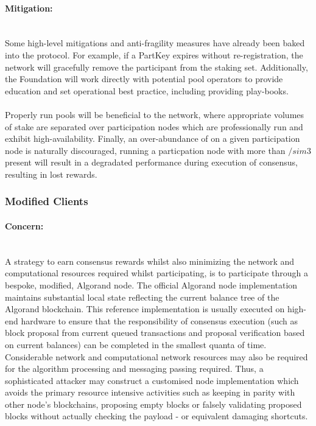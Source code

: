 \documentclass[11pt,a4paper]{article}
\begin{document}
\paragraph{Mitigation:} \mbox{}\\
Some high-level mitigations and anti-fragility measures have already been baked into the protocol. For example, if a
\gls{PartKey} expires without re-registration, the network will gracefully remove the participant from the staking set.
Additionally, the Foundation will work directly with potential pool operators to provide education and set operational
best practice, including providing play-books. \\ \\
Properly run pools will be beneficial to the network, where appropriate volumes of stake are separated over
participation nodes which are professionally run and exhibit high-availability. Finally, an over-abundance of 
 on a given participation node is naturally discouraged, running a particpation node with more than 
$/sim$3  present will result in a degradated performance during execution of consensus, resulting in 
lost rewards.

\pagebreak

\subsubsection{Modified Clients}

\paragraph{Concern:} \mbox{}\\
A strategy to earn consensus rewards whilst also minimizing the network and computational resources required whilst 
participating, is to participate through a bespoke, modified, Algorand node. The official Algorand node implementation 
maintains substantial local state reflecting the current balance tree of the Algorand blockchain. This reference 
implementation is usually executed on high-end hardware to ensure that the responsibility of consensus execution (such 
as block proposal from current queued transactions and proposal verification based on current balances) can be completed 
in the smallest quanta of time. Considerable network and computational network resources may also be required for the 
algorithm processing and messaging passing required. Thus, a sophisticated attacker may construct a customised node 
implementation which avoids the primary resource intensive activities such as keeping in parity with other node's 
blockchains, proposing empty blocks or falsely validating proposed blocks without actually checking the payload - or 
equivalent damaging shortcuts. 
\end{document}

